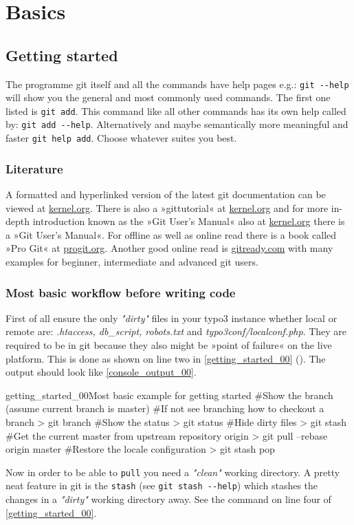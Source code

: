 \section{Basics}
\subsection{Getting started}
The programme git itself and all the commands have help pages e.g.: \texttt{git -{}-help} will show you the general and most commonly used commands. The first one listed is \texttt{git add}. This command like all other commands has its own help called by: \texttt{git add -{}-help}. Alternatively and maybe semantically more meaningful and faster \texttt{git help add}. Choose whatever suites you best.
\subsubsection{Literature}
A formatted and hyperlinked version of the latest git documentation can be viewed at \href{http://www.kernel.org/pub/software/scm/git/docs/}{kernel.org}. There is also a »gittutorial« at \href{http://www.kernel.org/pub/software/scm/git/docs/gittutorial.html}{kernel.org} and for more in-depth introduction known as the »Git User’s Manual« also at \href{http://www.kernel.org/pub/software/scm/git/docs/user-manual.html}{kernel.org} there is a »Git User’s Manual«. For offline as well as online read there is a book called »Pro Git« at \href{http://progit.org/}{progit.org}. Another good online read is \href{http://gitready.com/}{gitready.com} with many examples for beginner, intermediate and advanced git users.
\subsubsection{Most basic workflow before writing code}
First of all ensure the only \textit{"dirty"} files in your typo3 instance whether local or remote are: \textit{.htaccess, db\_script, robots.txt} and \textit{typo3conf/localconf.php}. They are required to be in git because they also might be »point of failure« on the live platform. This is done as shown on line two in \ref{getting_started_00} (). The output should look like \ref{console_output_00}. 
\begin{codelisting}{getting_started_00}{Most basic example for getting started}
#Show the branch (assume current branch is master)
#If not see branching how to checkout a branch 
> git branch
#Show the status
> git status
#Hide dirty files
> git stash
#Get the current master from upstream repository origin
> git pull --rebase origin master 
#Restore the locale configuration
> git stash pop 
\end{codelisting}
Now in order to be able to \texttt{pull} you need a \textit{"clean"} working directory. A pretty neat feature in git is the \texttt{stash} (see \texttt{git stash -{}-help}) which stashes the changes in a \textit{"dirty"} working directory away. See the command on line four of \ref{getting_started_00}.

